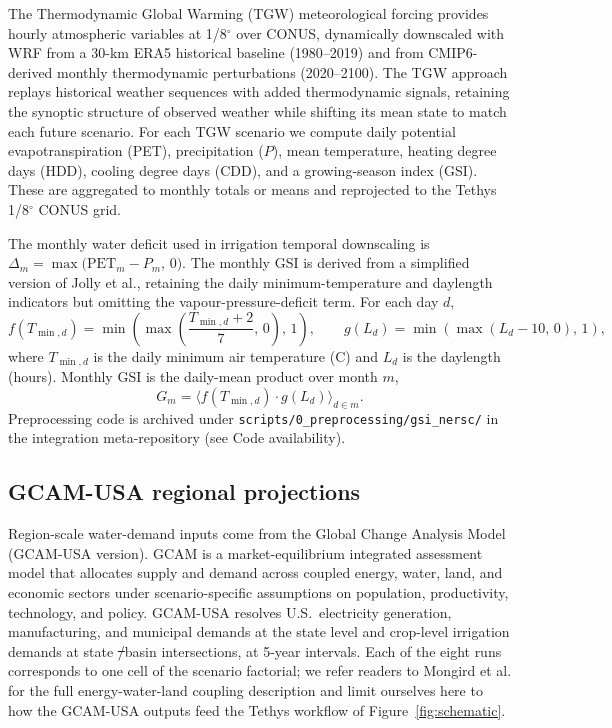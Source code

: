 \documentclass[fleqn,10pt]{wlscirep}
\providecommand{\DIFadd}[1]{{\protect\color{blue}\uwave{#1}}} %
\providecommand{\DIFdel}[1]{{\protect\color{red}\sout{#1}}} %
\providecommand{\DIFaddbegin}{} %
\providecommand{\DIFaddend}{} %
\providecommand{\DIFdelbegin}{} %
\providecommand{\DIFdelend}{} %
\begin{document}
The Thermodynamic Global Warming (TGW) meteorological forcing\cite{Jones2023TGW} provides hourly atmospheric variables at 1/8$^{\circ}$ over CONUS, dynamically downscaled with WRF from a 30-km ERA5 historical baseline (1980--2019) and from CMIP6-derived monthly thermodynamic perturbations (2020--2100). The TGW approach replays historical weather sequences with added thermodynamic signals, retaining the synoptic structure of observed weather while shifting its mean state to match each future scenario. For each TGW scenario we compute daily potential evapotranspiration (PET), precipitation ($P$), mean temperature, heating degree days (HDD), cooling degree days (CDD), and a growing-season index (GSI). These are aggregated to monthly totals or means and reprojected to the Tethys 1/8$^{\circ}$ CONUS grid.

The monthly water deficit used in irrigation temporal downscaling is $\Delta_m = \max\!\big(\text{PET}_m - P_m,\, 0\big)$. The monthly GSI is derived from a simplified version of Jolly et al.\cite{Jolly_2005}, retaining the daily minimum-temperature and daylength indicators but omitting the vapour-pressure-deficit term. For each day $d$,
\begin{equation}
f(T_{\min,d}) = \min\!\left(\max\!\left(\frac{T_{\min,d}+2}{7},\,0\right),\,1\right), \qquad
g(L_d) = \min\!\left(\max\!\left(L_d - 10,\,0\right),\,1\right),
\label{eq:gsi-components}
\end{equation}
where $T_{\min,d}$ is the daily minimum air temperature (\textdegree C) and $L_d$ is the daylength (hours). Monthly GSI is the daily-mean product over month $m$,
\begin{equation}
G_m = \big\langle f(T_{\min,d}) \cdot g(L_d) \big\rangle_{d \in m}.
\label{eq:gsi-monthly}
\end{equation}
Preprocessing code is archived under \texttt{scripts/0\_preprocessing/gsi\_nersc/} in the integration meta-repository (see Code availability).

\subsection*{GCAM-USA regional projections}

Region-scale water-demand inputs come from the Global Change Analysis Model (GCAM-USA version)\cite{Zhao_gcamusa_water,Zhao2024,Calvin2019GCAM,Binsted_2022}. GCAM is a market-equilibrium integrated assessment model that allocates supply and demand across coupled energy, water, land, and economic sectors under scenario-specific assumptions on population, productivity, technology, and policy. GCAM-USA resolves U.S.\ electricity generation, manufacturing, and municipal demands at the state level and crop-level irrigation demands at state \DIFdelbegin \DIFdel{/}\DIFdelend \DIFaddbegin \DIFadd{$\times$ }\DIFaddend basin intersections, at 5-year intervals. Each of the eight runs corresponds to one cell of the scenario factorial; we refer readers to Mongird et al.\cite{Mongird2025CERF} for the full energy-water-land coupling description and limit ourselves here to how the GCAM-USA outputs feed the Tethys workflow of Figure~\ref{fig:schematic}.
\end{document}
